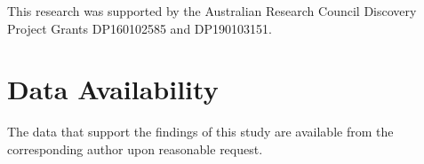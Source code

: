 \documentclass[aip,graphicx]{revtex4-1}
\begin{document}
\begin{acknowledgments}
	This research was supported by the Australian Research Council Discovery
	Project Grants DP160102585 and DP190103151.  
\end{acknowledgments}

\section*{Data Availability}
The data that support the findings of this study are available from the corresponding author upon reasonable request.


\end{document}
